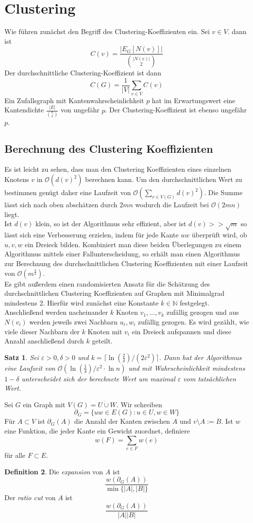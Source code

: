 \documentclass[a4paper, 12pt]{article}
\theoremstyle{plain}
\newtheorem{theorem}{Satz}[subsection] %
\theoremstyle{definition}
\newtheorem{definition}[theorem]{Definition} %
\theoremstyle{lemma}
\theoremstyle{remark}
\theoremstyle{corollary}
\theoremstyle{example}
\begin{document}
	\section{Clustering}
	Wie führen zunächst den Begriff des Clustering-Koeffizienten ein. Sei $v \in V$. dann ist \[C(v) = \frac{\left|E_G[N(v)]\right|}{\binom{\left|N(v)\right|}{2}}\] Der durchschnittliche Clustering-Koeffizient ist dann \[C(G) = \frac{1}{\left|V\right|} \sum_{v \in V} C(v)\] Ein Zufallsgraph mit Kantenwahrscheinlichkeit $p$ hat im Erwartungswert eine Kantendichte $\frac{\left|E\right|}{\binom{n}{2}}$ von ungefähr $p$. Der Clustering-Koeffizient ist ebenso ungefähr $p$.
	\subsection{Berechnung des Clustering Koeffizienten}
	Es ist leicht zu sehen, dass man den Clustering Koeffizienten eines einzelnen Knotens $v$ in $\mathcal{O}(d(v)^2)$ berechnen kann. Um den durchschnittlichen Wert zu bestimmen genügt daher eine Laufzeit von $\mathcal{O}(\sum_{v \in V(G)} d(v)^2)$. Die Summe lässt sich nach oben abschätzen durch $2mn$ wodurch die Laufzeit bei $\mathcal{O}(2mn)$ liegt.\\
	Ist $d(v)$ klein, so ist der Algorithmus sehr effizient, aber ist $d(v) >> \sqrt{m}$ so lässt sich eine Verbesserung erzielen, indem für jede Kante $uw$ überprüft wird, ob $u,v,w$ ein Dreieck bilden. Kombiniert man diese beiden Überlegungen zu einem Algorithmus mittels einer Fallunterscheidung, so erhält man einen Algorithmus zur Berechnung des durchschnittlichen Clustering Koeffizienten mit einer Laufzeit von $\mathcal{O}(m^\frac{3}{2})$.\\
	Es gibt außerdem einen randomisierten Ansatz für die Schätzung des durchschnittlichen Clustering Koeffizienten auf Graphen mit Minimalgrad mindestens 2. Hierfür wird zunächst eine Konstante $k\in\mathbb{N}$ festgelegt. Anschließend werden nacheinander $k$ Knoten $v_1,...,v_k$ zufällig gezogen und aus $N(v_i)$ werden jeweils zwei Nachbarn $u_i,w_i$ zufällig gezogen. Es wird gezählt, wie viele dieser Nachbarn der $k$ Knoten mit $v_i$ ein Dreieck aufspannen und diese Anzahl anschließend durch $k$ geteilt.
	\begin{theorem}
		Sei $\varepsilon>0, \delta>0$ und $k=\lceil\ln\left(\frac{2}{\delta}\right)/(2\varepsilon^2)\rceil$. Dann hat der Algorithmus eine Laufzeit von $\mathcal{O}(\ln\left(\frac{1}{\delta}\right)/\varepsilon^2\cdot \ln n)$ und mit Wahrscheinlichkeit mindestens $1-\delta$ unterscheidet sich der berechnete Wert um maximal $\varepsilon$ vom tatsächlichen Wert.
	\end{theorem}
	Sei $G$ ein Graph mit $V(G) = U \dot\cup W$. Wir schreiben \[\partial_G = \{uw \in E(G): u \in U, w \in W\}\] Für $A \subset V$ ist $\partial_G(A)$ die Anzahl der Kanten zwischen $A$ und $v\setminus A := B$. Ist $w$ eine Funktion, die jeder Kante ein Gewicht zuordnet, definiere \[w(F) = \sum_{e \in F} w(e)\] für alle $F\subset E$.
	\begin{definition}
		Die \textit{expansion} von $A$ ist \[\frac{w(\partial_G(A))}{\min\{\left|A\right|,\left|B\right|\}}\]
		Der \textit{ratio cut} von $A$ ist \[\frac{w(\partial_G(A))}{\left|A\right|\left|B\right|}\]
	\end{definition}
\end{document}

